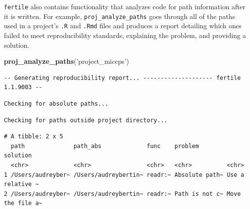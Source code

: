 \documentclass[12pt,twoside]{reedthesis}
\newenvironment{Shaded}{\begin{snugshade}}{\end{snugshade}}
\newcommand{\KeywordTok}[1]{\textcolor[rgb]{0.13,0.29,0.53}{\textbf{#1}}}
\newcommand{\NormalTok}[1]{#1}
\newcommand{\StringTok}[1]{\textcolor[rgb]{0.31,0.60,0.02}{#1}}
\begin{document}
\texttt{fertile} also contains functionality that analyzes code for path information after it is written. For example, \texttt{proj\_analyze\_paths} goes through all of the paths used in a project's \texttt{.R} and \texttt{.Rmd} files and produces a report detailing which ones failed to meet reproducibility standards, explaining the problem, and providing a solution.
\begin{Shaded}
\begin{Highlighting}[]
\KeywordTok{proj_analyze_paths}\NormalTok{(}\StringTok{'project_miceps'}\NormalTok{)}
\end{Highlighting}
\end{Shaded}
\footnotesize
\begin{verbatim}
-- Generating reproducibility report... -------------------- fertile 1.1.9003 --
\end{verbatim}
\begin{verbatim}
Checking for absolute paths...
\end{verbatim}
\begin{verbatim}
Checking for paths outside project directory...
\end{verbatim}
\begin{verbatim}
# A tibble: 2 x 5
  path              path_abs             func    problem        solution        
  <chr>             <chr>                <chr>   <chr>          <chr>           
1 /Users/audreyber~ /Users/audreybertin~ readr:~ Absolute path~ Use a relative ~
2 /Users/audreyber~ /Users/audreybertin~ readr:~ Path is not c~ Move the file a~
\end{verbatim}
\normalsize
\end{document}
